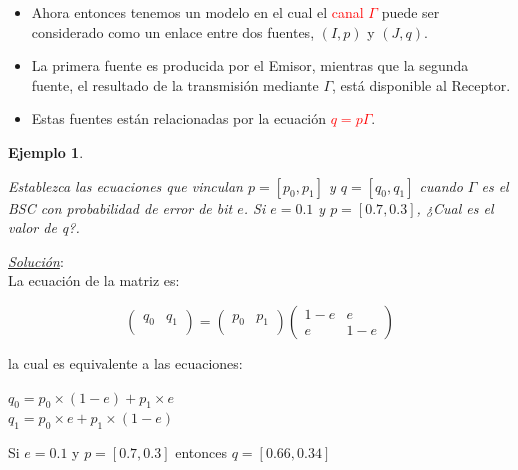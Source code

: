 \documentclass{beamer}
\theoremstyle{plain}
\theoremstyle{example}
\theoremstyle{example}
\newtheorem{ejemplo} [Ejemplo] {Ejemplo}
\begin{document}
\begin{frame}  \small  

\begin{itemize}  

\item Ahora entonces tenemos un modelo en el cual el \textcolor{red}{canal $\Gamma$} puede ser considerado como un enlace entre dos fuentes, $(I,p)$ y $(J,q)$.
\item  La primera fuente es producida por el Emisor, mientras que la segunda fuente, el resultado de la transmisión mediante $\Gamma$, está disponible al Receptor.  
\item Estas fuentes están relacionadas por la ecuación \textcolor{red}{$q=p\Gamma$}.
\end{itemize} 

\end{frame} 



\begin{frame}  \small 

\begin{ejemplo}\label{ej:BSC}

Establezca las ecuaciones que vinculan $p = [p_0,p_1]$ y $q = [q_0,q_1]$ cuando $\Gamma$ es el BSC con probabilidad de error de bit $e$. 
Si $e = 0.1$ y $p = [0.7, 0.3]$, ¿Cual es el valor de q?.\\

\end{ejemplo}

\textit{\underline{Solución}}:\\
\vspace{0.3cm}
La ecuación de la matriz es:

\[
\left( \begin{array}{lc}
            q_{0}       & q_{1}      \\
           \end{array}
    \right)  = \left( \begin{array}{lc}
            p_{0}       & p_{1}      \\
           \end{array}
    \right) \left( \begin{array}{cc}
           1-e       & e      \\
            e    & 1-e      
           \end{array}
    \right)    
\]

la cual es equivalente a las ecuaciones:

\begin{center}
$q_0	= p_0 \times (1 - e) + p_1 \times  e$\\
$q_1	= p_0 \times e  + p_1 \times  (1 - e)$
\end{center}

Si $e = 0.1$ y $p = [0.7, 0.3]$ entonces $q = [0.66, 0.34]$


\end{frame} 
\end{document}
